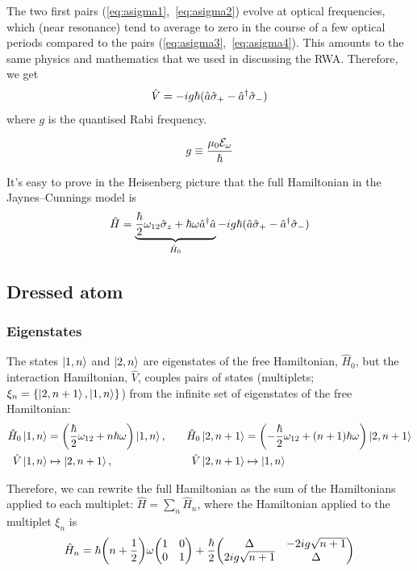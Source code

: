 The two first pairs (\ref{eq:asigma1},~\ref{eq:asigma2}) evolve at optical frequencies, which (near resonance) tend to average to zero in the course of a few optical periods compared to the pairs (\ref{eq:asigma3},~\ref{eq:asigma4}). This amounts to the same physics and mathematics that we used in discussing the RWA. Therefore, we get
\begin{align}
	\hat{V} = - ig \hbar (\hat{a} \hat{\sigma}_{+} - \hat{a}^{\dagger}{} \hat{\sigma}_{-} )
\end{align}
where $g$ is the quantised Rabi frequency.

\begin{defi}
	\begin{align}
		g \equiv \frac{\mu_{0} \mathcal{E}_{\omega}}{\hbar}
	\end{align}
\end{defi}

It's easy to prove in the Heisenberg picture that the full Hamiltonian in the Jaynes--Cunnings model is
\begin{align}
	\hat{H} = \underbrace{ \frac{\hbar}{2} \omega_{12} \hat{\sigma}_{z} + \hbar \omega \hat{a}^{\dagger}{} \hat{a} }_{\hat{H}_{0}} - ig \hbar (\hat{a} \hat{\sigma}_{+} - \hat{a}^{\dagger}{} \hat{\sigma}_{-} )
\end{align}

\subsection{Dressed atom}
\subsubsection*{Eigenstates}
The states $\ket{1, n}$ and $\ket{2, n}$ are eigenstates of the free Hamiltonian, $\hat{H}_{0}$, but the interaction Hamiltonian, $\hat{V}$, couples pairs of states (multiplets; $\xi_{n} = \qty{\ket{2, n+1}, \ket{1, n}}$) from the infinite set of eigenstates of the free Hamiltonian:
\begin{alignat*}{2}
	\hat{H}_{0} \ket{1, n} &= \qty(\frac{\hbar}{2} \omega_{12} + n \hbar \omega ) \ket{1, n} \qc & \hat{H}_{0} \ket{2, n+1} &= \qty(-\frac{\hbar}{2} \omega_{12} + (n+1) \hbar \omega ) \ket{2, n+1} \\
	\hat{V} \ket{1, n} &\mapsto \ket{2, n+1} \qc & \hat{V} \ket{2, n+1} &\mapsto \ket{1, n}
\end{alignat*}

Therefore, we can rewrite the full Hamiltonian as the sum of the Hamiltonians applied to each multiplet: $\hat{H} = \sum_{n} \hat{H}_{n}$, where the Hamiltonian applied to the multiplet $\xi_{n}$ is
\begin{align}
	\hat{H}_{n} = \hbar \qty(n + \frac{1}{2}) \omega \mqty(1 & 0 \\ 0 & 1) + \frac{\hbar}{2} \mqty( \Delta & - 2 i g \sqrt{n+1} \\ 2 i g \sqrt{n+1} & \Delta )
\end{align}

